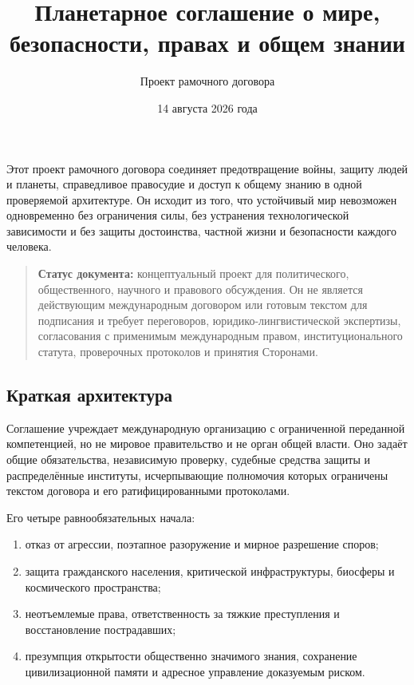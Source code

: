 \documentclass[
  russian,
  11pt,
  a4paper,
]{article}
\title{Планетарное соглашение о мире, безопасности, правах и общем
знании}
\subtitle{Проект рамочного договора}
\author{}
\date{14 августа 2026 года}
\providecommand{\tightlist}{%
  \setlength{\itemsep}{0pt}\setlength{\parskip}{0pt}}
\begin{document}
\maketitle

\thispagestyle{empty}\clearpage

\renewcommand*\contentsname{Содержание}
{
\setcounter{tocdepth}{3}
\tableofcontents
}
Этот проект рамочного договора соединяет предотвращение войны, защиту
людей и планеты, справедливое правосудие и доступ к общему знанию в
одной проверяемой архитектуре. Он исходит из того, что устойчивый мир
невозможен одновременно без ограничения силы, без устранения
технологической зависимости и без защиты достоинства, частной жизни и
безопасности каждого человека.

\begin{quote}
\textbf{Статус документа:} концептуальный проект для политического,
общественного, научного и правового обсуждения. Он не является
действующим международным договором или готовым текстом для подписания и
требует переговоров, юридико-лингвистической экспертизы, согласования с
применимым международным правом, институционального статута, проверочных
протоколов и принятия Сторонами.
\end{quote}

\subsection{Краткая
архитектура}\label{ux43aux440ux430ux442ux43aux430ux44f-ux430ux440ux445ux438ux442ux435ux43aux442ux443ux440ux430}

Соглашение учреждает международную организацию с ограниченной переданной
компетенцией, но не мировое правительство и не орган общей власти. Оно
задаёт общие обязательства, независимую проверку, судебные средства
защиты и распределённые институты, исчерпывающие полномочия которых
ограничены текстом договора и его ратифицированными протоколами.

Его четыре равнообязательных начала:

\begin{enumerate}
\def\labelenumi{\arabic{enumi}.}
\tightlist
\item
  отказ от агрессии, поэтапное разоружение и мирное разрешение споров;
\item
  защита гражданского населения, критической инфраструктуры, биосферы и
  космического пространства;
\item
  неотъемлемые права, ответственность за тяжкие преступления и
  восстановление пострадавших;
\item
  презумпция открытости общественно значимого знания, сохранение
  цивилизационной памяти и адресное управление доказуемым риском.
\end{enumerate}
\end{document}
